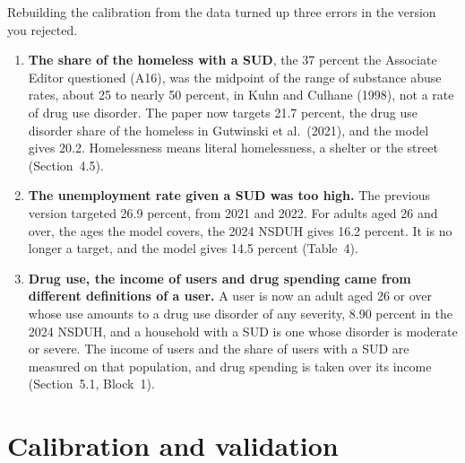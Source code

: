 \documentclass[11pt]{article}
\begin{document}
{\color{respred}
\concede Rebuilding the calibration from the data turned up three errors in the version you
rejected.
\begin{enumerate}
\item \textbf{The share of the homeless with a SUD}, the 37 percent the Associate Editor
questioned (A16), was the midpoint of the range of substance abuse rates, about 25 to nearly 50
percent, in Kuhn and Culhane (1998), not a rate of drug use disorder. The paper now targets
21.7 percent, the drug use disorder share of the homeless in Gutwinski et al.\ (2021), and the
model gives 20.2. Homelessness means literal homelessness, a shelter or the street
(Section~4.5).

\item \textbf{The unemployment rate given a SUD was too high.} The previous version targeted
26.9 percent, from 2021 and 2022. For adults aged 26 and over, the ages the model covers, the
2024 NSDUH gives 16.2 percent. It is no longer a target, and the model gives 14.5 percent
(Table~4).

\item \textbf{Drug use, the income of users and drug spending came from different definitions
of a user.} A user is now an adult aged 26 or over whose use amounts to a drug use disorder of
any severity, 8.90 percent in the 2024 NSDUH, and a household with a SUD is one whose disorder
is moderate or severe. The income of users and the share of users with a SUD are measured on
that population, and drug spending is taken over its income (Section~5.1, Block~1).
\end{enumerate}
}

\section*{\color{respred}Calibration and validation}
\end{document}
